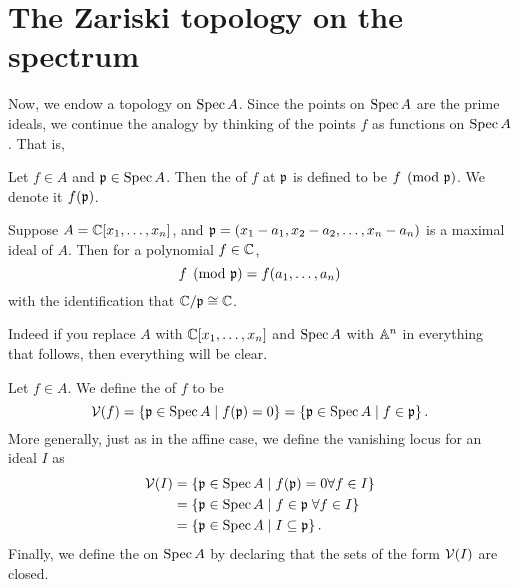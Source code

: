 \section{The Zariski topology on the spectrum}

Now, we endow a topology on $\operatorname{Spec} A$.
Since the points on $\operatorname{Spec} A$ are the prime ideals, we continue
the analogy by thinking of the points $f$ as functions on $\operatorname{Spec} A$. That is,
\begin{definition}
	Let $f \in A$ and $\mathfrak p \in \operatorname{Spec} A$.
	Then the  of $f$ at $\mathfrak p$ is defined to be $f \pmod{\mathfrak p}$.
	We denote it $f(\mathfrak p)$.
\end{definition}
\begin{example}
	Suppose $A = \mathbb C[x_1, \dots, x_n]$,
	and $\mathfrak p = (x_1-a_1, x_2-a_2, \dots, x_n-a_n)$ is a maximal ideal of $A$.
	Then for a polynomial $f \in \mathbb C$,
	\[ f \pmod {\mathfrak p} = f(a_1, \dots, a_n) \]
	with the identification that $\mathbb C/\mathfrak p \cong \mathbb C$.
\end{example}
Indeed if you replace $A$ with $\mathbb C[x_1, \dots, x_n]$
and $\operatorname{Spec} A$ with $\mathbb A^n$ in everything that follows,
then everything will be clear.

\begin{definition}
	Let $f \in A$. We define the  of $f$ to be
	\[ \mathcal V(f) = \left\{ \mathfrak p \in \operatorname{Spec} A \mid f(\mathfrak p) = 0 \right\}
		= \left\{ \mathfrak p \in \operatorname{Spec} A \mid f \in \mathfrak p \right\}. \]
	More generally, just as in the affine case,
	we define the vanishing locus for an ideal $I$ as
	\begin{align*}
		\mathcal V(I) &= \left\{ \mathfrak p \in \operatorname{Spec} A \mid f(\mathfrak p)=0 \forall f \in I \right\} \\
		&= \left\{ \mathfrak p \in \operatorname{Spec} A \mid f \in \mathfrak p \; \forall f \in I \right\} \\
		&= \left\{ \mathfrak p \in \operatorname{Spec} A \mid I \subseteq \mathfrak p \right\}.
	\end{align*}
	Finally, we define the  on $\operatorname{Spec} A$
	by declaring that the sets of the form $\mathcal V(I)$ are closed.
\end{definition}

